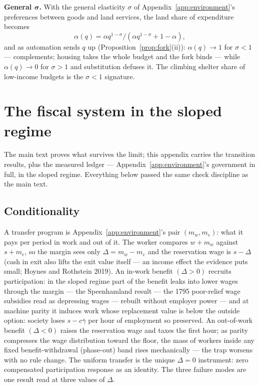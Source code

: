 \documentclass[12pt]{article}
\theoremstyle{plain}
\begin{document}
\textbf{General $\bm{\sigma}$.} With the general elasticity $\sigma$ of Appendix~\ref{app:environment}'s preferences between goods and land services, the land share of expenditure becomes
\begin{equation}\label{eq:ces-share}
\alpha (q) = \alpha q^{1-\sigma} / (\alpha q^{1-\sigma} + 1 - \alpha ),
\end{equation}
and as automation sends $q$ up (Proposition~\ref{prop:fork}(ii)): $\alpha (q) \to 1$ for $\sigma < 1$ --- complements; housing takes the whole budget and the fork binds --- while $\alpha (q) \to 0$ for $\sigma > 1$ and substitution defuses it. The climbing shelter share of low-income budgets is the $\sigma < 1$ signature.

\section{The fiscal system in the sloped regime}\label{app:fiscal}

The main text proves what survives the limit; this appendix carries the transition results, plus the measured ledger --- Appendix~\ref{app:environment}'s government in full, in the sloped regime. Everything below passed the same check discipline as the main text.

\subsection{Conditionality}\label{app:conditionality}

A transfer program is Appendix~\ref{app:environment}'s pair $(m_w, m_e)$: what it pays per period in work and out of it. The worker compares $w + m_w$ against $s + m_e$, so the margin sees only $\Delta = m_w - m_e$ and the reservation wage is $s - \Delta$ (cash in exit also lifts the exit value itself --- an income effect the evidence puts small; Hoynes and Rothstein 2019). An in-work benefit $(\Delta > 0)$ recruits participation: in the sloped regime part of the benefit leaks into lower wages through the margin --- the Speenhamland result --- the 1795 poor-relief wage subsidies read as depressing wages --- rebuilt without employer power --- and at machine parity it induces work whose replacement value is below the outside option: society loses $s - c\bar{\gamma}$ per hour of employment so preserved. An out-of-work benefit $(\Delta < 0)$ raises the reservation wage and taxes the first hour; as parity compresses the wage distribution toward the floor, the mass of workers inside any fixed benefit-withdrawal (phase-out) band rises mechanically --- the trap worsens with no rule change. The uniform transfer is the unique $\Delta = 0$ instrument: zero compensated participation response as an identity. The three failure modes are one result read at three values of $\Delta$.
\end{document}
